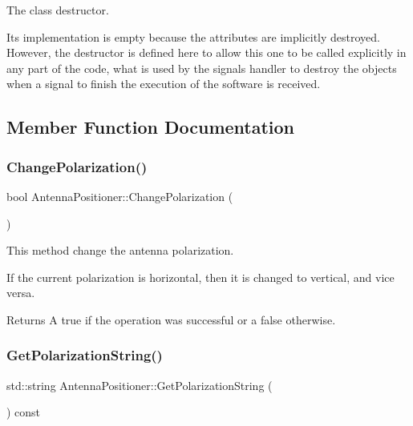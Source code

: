 The class destructor. 

Its implementation is empty because the attributes are implicitly destroyed. However, the destructor is defined here to allow this one to be called explicitly in any part of the code, what is used by the signals handler to destroy the objects when a signal to finish the execution of the software is received. 

\subsection{Member Function Documentation}
\mbox{\label{classAntennaPositioner_a0e4f58f67280f2a6daa10c7cc02f0abd}} 
\subsubsection{\texorpdfstring{Change\+Polarization()}{ChangePolarization()}}
{\footnotesize\ttfamily bool Antenna\+Positioner\+::\+Change\+Polarization (\begin{DoxyParamCaption}{ }\end{DoxyParamCaption})}



This method change the antenna polarization. 

If the current polarization is horizontal, then it is changed to vertical, and vice versa. \begin{DoxyReturn}{Returns}
A {\ttfamily true} if the operation was successful or a {\ttfamily false} otherwise. 
\end{DoxyReturn}
\mbox{\label{classAntennaPositioner_a897b759fa711bd8a4261e57177e3db1c}} 
\subsubsection{\texorpdfstring{Get\+Polarization\+String()}{GetPolarizationString()}}
{\footnotesize\ttfamily std\+::string Antenna\+Positioner\+::\+Get\+Polarization\+String (\begin{DoxyParamCaption}{ }\end{DoxyParamCaption}) const}



